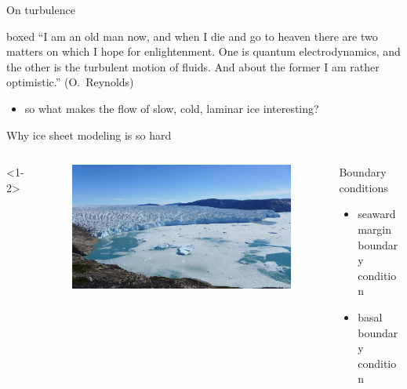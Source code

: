 \documentclass[hide notes,intlimits,unknownkeysallowed]{beamer}
\begin{document}
\begin{frame}{On turbulence}
  \begin{beamercolorbox}[rounded=true,shadow=true]{boxed}
    ``I am an old man now, and when I die and go to heaven there are two matters on which I hope for enlightenment. One is quantum electrodynamics, and the other is the turbulent motion of fluids. And about the former I am rather optimistic.'' (O.~Reynolds)
  \end{beamercolorbox}
  \begin{itemize}
  \item so what makes the flow of slow, cold, laminar ice interesting?
  \end{itemize}
\end{frame}


\begin{frame}{Why ice sheet modeling is so hard}
    \begin{columns}[c]<1-2>
      \begin{column}{.28\linewidth}
        \begin{figure}
          \includegraphics[width=\linewidth]{storeglacier}
        \end{figure}
      \end{column}
      \begin{column}{.67\linewidth}
        \begin{block}{Boundary conditions}
        \begin{itemize}
        \item seaward margin boundary condition
        \item basal boundary condition
        \end{itemize}
      \end{block}
      \end{column}
    \end{columns}

\end{frame}
\end{document}

